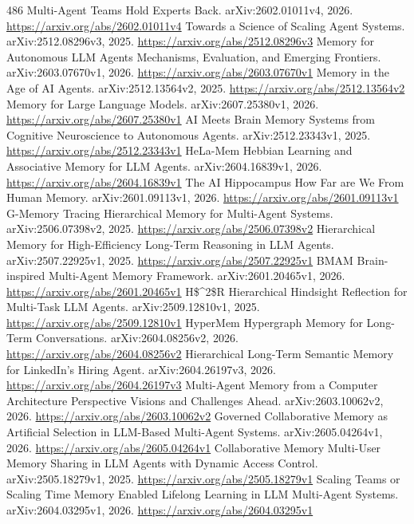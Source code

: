\documentclass[11pt]{article}
\begin{document}
\begin{thebibliography}{486}
 Multi-Agent Teams Hold Experts Back. arXiv:2602.01011v4, 2026. \url{https://arxiv.org/abs/2602.01011v4}
 Towards a Science of Scaling Agent Systems. arXiv:2512.08296v3, 2025. \url{https://arxiv.org/abs/2512.08296v3}
 Memory for Autonomous LLM Agents Mechanisms, Evaluation, and Emerging Frontiers. arXiv:2603.07670v1, 2026. \url{https://arxiv.org/abs/2603.07670v1}
 Memory in the Age of AI Agents. arXiv:2512.13564v2, 2025. \url{https://arxiv.org/abs/2512.13564v2}
 Memory for Large Language Models. arXiv:2607.25380v1, 2026. \url{https://arxiv.org/abs/2607.25380v1}
 AI Meets Brain Memory Systems from Cognitive Neuroscience to Autonomous Agents. arXiv:2512.23343v1, 2025. \url{https://arxiv.org/abs/2512.23343v1}
 HeLa-Mem Hebbian Learning and Associative Memory for LLM Agents. arXiv:2604.16839v1, 2026. \url{https://arxiv.org/abs/2604.16839v1}
 The AI Hippocampus How Far are We From Human Memory. arXiv:2601.09113v1, 2026. \url{https://arxiv.org/abs/2601.09113v1}
 G-Memory Tracing Hierarchical Memory for Multi-Agent Systems. arXiv:2506.07398v2, 2025. \url{https://arxiv.org/abs/2506.07398v2}
 Hierarchical Memory for High-Efficiency Long-Term Reasoning in LLM Agents. arXiv:2507.22925v1, 2025. \url{https://arxiv.org/abs/2507.22925v1}
 BMAM Brain-inspired Multi-Agent Memory Framework. arXiv:2601.20465v1, 2026. \url{https://arxiv.org/abs/2601.20465v1}
 H\$\textasciicircum{}2\$R Hierarchical Hindsight Reflection for Multi-Task LLM Agents. arXiv:2509.12810v1, 2025. \url{https://arxiv.org/abs/2509.12810v1}
 HyperMem Hypergraph Memory for Long-Term Conversations. arXiv:2604.08256v2, 2026. \url{https://arxiv.org/abs/2604.08256v2}
 Hierarchical Long-Term Semantic Memory for LinkedIn's Hiring Agent. arXiv:2604.26197v3, 2026. \url{https://arxiv.org/abs/2604.26197v3}
 Multi-Agent Memory from a Computer Architecture Perspective Visions and Challenges Ahead. arXiv:2603.10062v2, 2026. \url{https://arxiv.org/abs/2603.10062v2}
 Governed Collaborative Memory as Artificial Selection in LLM-Based Multi-Agent Systems. arXiv:2605.04264v1, 2026. \url{https://arxiv.org/abs/2605.04264v1}
 Collaborative Memory Multi-User Memory Sharing in LLM Agents with Dynamic Access Control. arXiv:2505.18279v1, 2025. \url{https://arxiv.org/abs/2505.18279v1}
 Scaling Teams or Scaling Time Memory Enabled Lifelong Learning in LLM Multi-Agent Systems. arXiv:2604.03295v1, 2026. \url{https://arxiv.org/abs/2604.03295v1}

\end{thebibliography}
\end{document}
